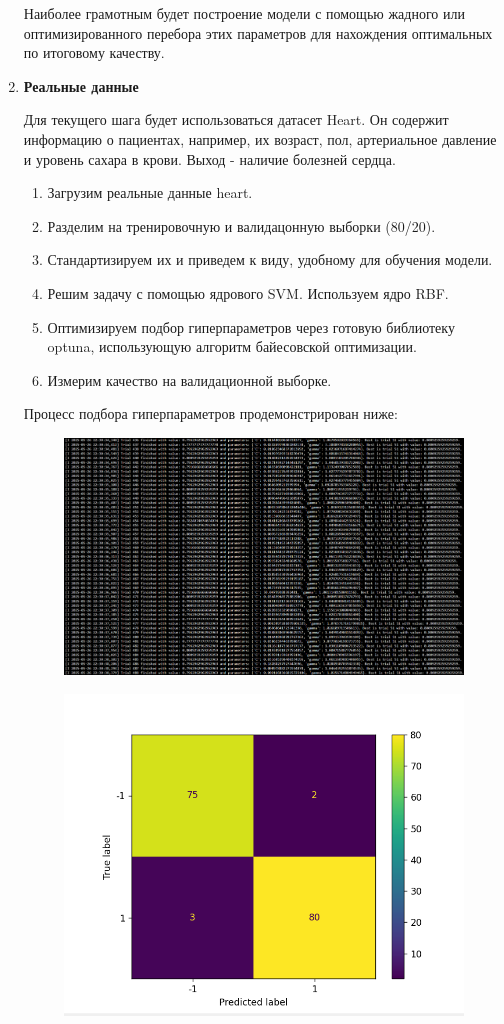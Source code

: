 \begin{enumerate}
Наиболее грамотным будет построение модели с помощью жадного или оптимизированного
перебора этих параметров для нахождения оптимальных по итоговому качеству.

\item \textbf{Реальные данные}

Для текущего шага будет использоваться датасет Heart. Он содержит информацию о пациентах, например, их возраст, пол, артериальное давление и уровень сахара в крови. Выход - наличие болезней сердца.



\begin{enumerate}
    \item Загрузим реальные данные heart.
    \item Разделим на тренировочную и валидацонную выборки (80/20).
    \item Стандартизируем их и приведем к виду, удобному для обучения модели.
    \item Решим задачу с помощью ядрового SVM. Используем ядро RBF.
    \item Оптимизируем подбор гиперпараметров через готовую библиотеку optuna, использующую алгоритм байесовской оптимизации.
    \item Измерим качество на валидационной выборке.
\end{enumerate}
Процесс подбора гиперпараметров продемонстрирован ниже:
    \begin{figure}[H]
        \centering
        \includegraphics[width=0.75\linewidth]{assets/res1.png}
    \end{figure}
    \begin{figure}[H]
        \centering
        \includegraphics[width=0.75\linewidth]{assets/res2.png}

\end{figure}
\end{enumerate}

